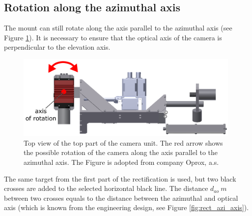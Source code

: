 \subsection{Rotation along the azimuthal axis}

The mount can still rotate along the axis parallel to the azimuthal axis (see Figure \ref{fig:rect_model_top_view}). It is necessary to ensure that the optical axis of the camera is perpendicular to the elevation axis. 

\begin{figure}[htb]
	\centering
	\includegraphics[width=11cm]{fig/rect_model_top_view.png}
	\caption{Top view of the top part of the camera unit. The red arrow shows the possible rotation of the camera along the axis parallel to the azimuthal axis. The Figure is adopted from company Oprox, a.s.}
	\label{fig:rect_model_top_view}
\end{figure}

The same target from the first part of the rectification is used, but two black crosses are added to the selected horizontal black line. The distance $d_{ao}\ m$ between two crosses equals to the distance between the azimuthal and optical axis (which is known from the engineering design, see Figure \ref{fig:rect_azi_axis}). 

